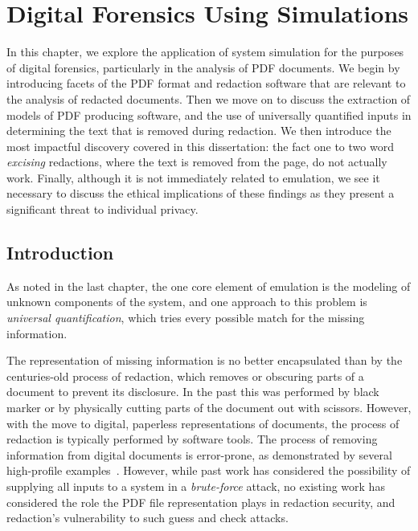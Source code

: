 \chapter{Digital Forensics Using Simulations}
\label{chap:info}


In this chapter, we explore the application of system simulation for the purposes of digital forensics, particularly in the analysis of PDF documents.
We begin by introducing facets of the PDF format and redaction software that are relevant to the analysis of redacted documents.
Then we move on to discuss the extraction of models of PDF producing software, and the use of universally quantified inputs in determining the text that is removed during redaction.
We then introduce the most impactful discovery covered in this dissertation: the fact one to two word \emph{excising} redactions, where the text is removed from the page, do not actually work.
Finally, although it is not immediately related to emulation, we see it necessary to discuss the ethical implications of these findings as they present a significant threat to individual privacy.

\section{Introduction}

As noted in the last chapter, the one core element of emulation is the modeling of unknown components of the system, and one approach to this problem is \emph{universal quantification}, which tries every possible match for the missing information.

The representation of missing information is no better encapsulated than by the centuries-old process of redaction, which removes or obscuring parts of a document to prevent its disclosure. 
In the past this was performed by black marker or by physically cutting parts of the document out with scissors.
However, with the move to digital, paperless representations of documents, the process of redaction is typically performed by software tools.
The process of removing information from digital documents is error-prone, as demonstrated by several high-profile examples~\cite{embarassingRedact}.
However, while past work has considered the possibility of supplying all inputs to a system in a \emph{brute-force} attack, no existing work has considered the role the PDF file representation plays in redaction security, and redaction's vulnerability to such guess and check attacks.

